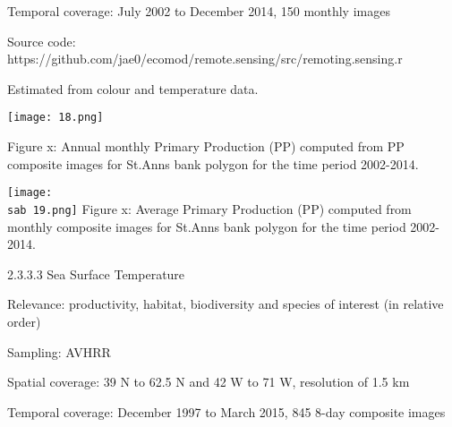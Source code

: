 \documentclass[letterpaper,portrait,12pt]{scrartcl}
\numberwithin{equation}{section}		%
\numberwithin{figure}{section}			%
\numberwithin{table}{section}				%
\newcommand{\sab}{\string~/ecomod_data/mpa/sab/}   %
\begin{document}
Temporal coverage: July 2002 to December 2014, 150 monthly  images




Source code: https://github.com/jae0/ecomod/remote.sensing/src/remoting.sensing.r














Estimated from colour and temperature data.









\texttt{[image: 18.png]}





Figure x: Annual monthly Primary Production (PP) computed from PP composite images for St.Anns bank polygon for the time period 2002-2014.









\texttt{[image: \\sab 19.png]}
Figure x: Average Primary Production (PP) computed from monthly composite images for St.Anns bank polygon for the time period 2002-2014.














2.3.3.3  Sea Surface Temperature









Relevance:  productivity, habitat, biodiversity and species of interest (in relative order)




Sampling:  AVHRR




Spatial coverage: \colorbox[rgb]{0.000,1.000,1.000}{39 N to 62.5 N and 42 W to 71 W,} resolution of 1.5 km




Temporal coverage: December 1997 to March 2015, 845 8-day composite images
\end{document}
